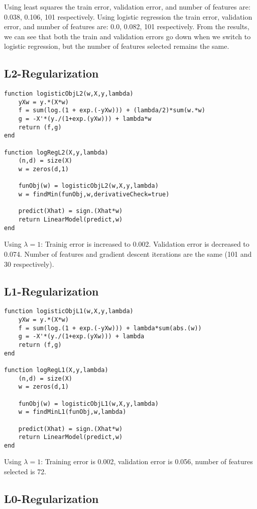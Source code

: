 \documentclass{article}
\begin{document}
Using least squares the train error, validation error, and number of features are: 0.038, 0.106, 101 respectively. Using logistic regression the train error, validation error, and number of features are: 0.0, 0.082, 101 respectively. From the results, we can see that both the train and validation errors go down when we switch to logistic regression, but the number of features selected remains the same.

\subsection{L2-Regularization}

\begin{verbatim}
function logisticObjL2(w,X,y,lambda)
    yXw = y.*(X*w)
    f = sum(log.(1 + exp.(-yXw))) + (lambda/2)*sum(w.*w)
    g = -X'*(y./(1+exp.(yXw))) + lambda*w
    return (f,g)
end

function logRegL2(X,y,lambda)
    (n,d) = size(X)
    w = zeros(d,1)

    funObj(w) = logisticObjL2(w,X,y,lambda)
    w = findMin(funObj,w,derivativeCheck=true)

    predict(Xhat) = sign.(Xhat*w)
    return LinearModel(predict,w)
end
\end{verbatim}
Using $\lambda = 1$:
Trainig error is increased to 0.002.
Validation error is decreased to 0.074.
Number of features and gradient descent iterations are the same (101 and 30 respectively).

\subsection{L1-Regularization}

\begin{verbatim}
function logisticObjL1(w,X,y,lambda)
    yXw = y.*(X*w)
    f = sum(log.(1 + exp.(-yXw))) + lambda*sum(abs.(w))
    g = -X'*(y./(1+exp.(yXw))) + lambda
    return (f,g)
end

function logRegL1(X,y,lambda)
    (n,d) = size(X)
    w = zeros(d,1)

    funObj(w) = logisticObjL1(w,X,y,lambda)
    w = findMinL1(funObj,w,lambda)

    predict(Xhat) = sign.(Xhat*w)
    return LinearModel(predict,w)
end
\end{verbatim}
 Using $\lambda = 1$: Training error is 0.002, validation error is 0.056, number of features selected is 72.


\subsection{L0-Regularization}
\end{document}
